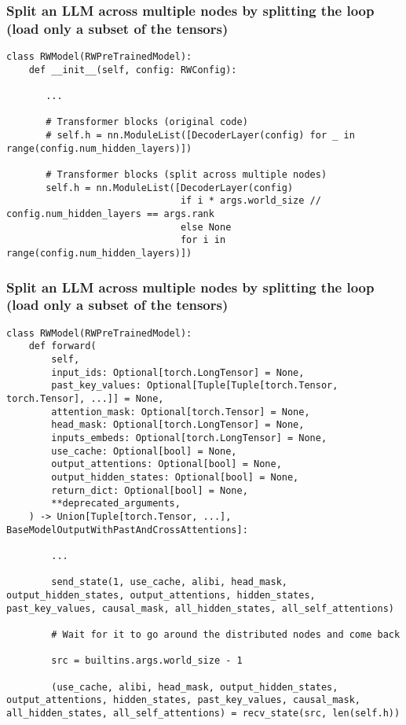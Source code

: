 \documentclass{beamer}
\begin{document}
\begin{frame}[fragile]
\frametitle{Split an LLM across multiple nodes by splitting the loop (load only a subset of the tensors)}
\tiny\begin{verbatim}
class RWModel(RWPreTrainedModel):
    def __init__(self, config: RWConfig):

       ...

       # Transformer blocks (original code)
       # self.h = nn.ModuleList([DecoderLayer(config) for _ in range(config.num_hidden_layers)])

       # Transformer blocks (split across multiple nodes)
       self.h = nn.ModuleList([DecoderLayer(config)
                               if i * args.world_size // config.num_hidden_layers == args.rank
                               else None
                               for i in range(config.num_hidden_layers)])
\end{verbatim}
\end{frame}

\begin{frame}[fragile]
\frametitle{Split an LLM across multiple nodes by splitting the loop (load only a subset of the tensors)}
\tiny\begin{verbatim}
class RWModel(RWPreTrainedModel):
    def forward(
        self,
        input_ids: Optional[torch.LongTensor] = None,
        past_key_values: Optional[Tuple[Tuple[torch.Tensor, torch.Tensor], ...]] = None,
        attention_mask: Optional[torch.Tensor] = None,
        head_mask: Optional[torch.LongTensor] = None,
        inputs_embeds: Optional[torch.LongTensor] = None,
        use_cache: Optional[bool] = None,
        output_attentions: Optional[bool] = None,
        output_hidden_states: Optional[bool] = None,
        return_dict: Optional[bool] = None,
        **deprecated_arguments,
    ) -> Union[Tuple[torch.Tensor, ...], BaseModelOutputWithPastAndCrossAttentions]:

        ...

        send_state(1, use_cache, alibi, head_mask, output_hidden_states, output_attentions, hidden_states, past_key_values, causal_mask, all_hidden_states, all_self_attentions)

        # Wait for it to go around the distributed nodes and come back

        src = builtins.args.world_size - 1

        (use_cache, alibi, head_mask, output_hidden_states, output_attentions, hidden_states, past_key_values, causal_mask, all_hidden_states, all_self_attentions) = recv_state(src, len(self.h))
\end{verbatim}
\end{frame}
\end{document}
